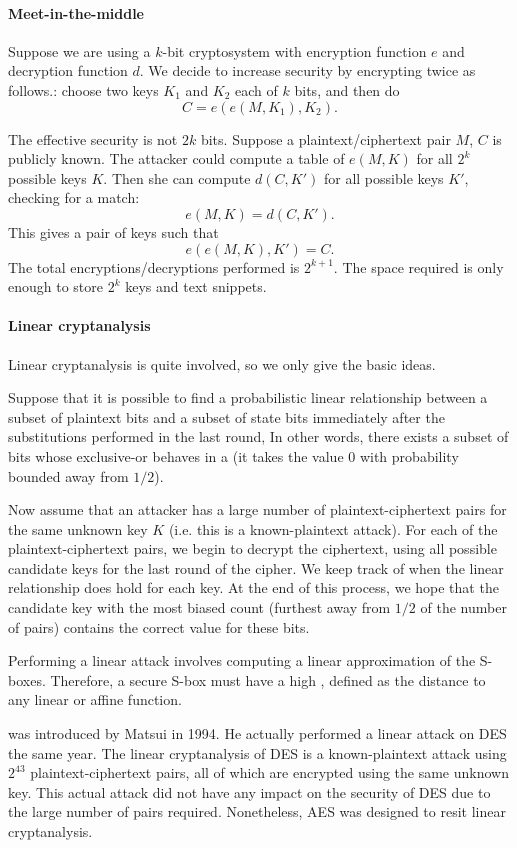 \documentclass[a4paper, 11pt, openany]{book}
\begin{document}
\paragraph{Meet-in-the-middle}
Suppose we are using a $k$-bit cryptosystem with encryption function $e$ and decryption function $d$. We decide to increase security by encrypting twice as follows.: choose two keys $K_1$ and $K_2$ each of $k$ bits, and then do
\[
    C = e( e(M,K_1) , K_2).
\]

The effective security is not $2k$ bits. Suppose a plaintext/ciphertext pair $M$, $C$ is publicly known. The attacker could compute a table of $e(M,K)$ for all $2^k$ possible keys $K$. Then she can compute $d(C,K')$ for all possible keys $K'$, checking for a match:
\[
    e(M,K) = d(C,K').
\]
This gives a pair of keys such that
\[
    e( e(M,K) , K') = C.
\]
The total encryptions/decryptions performed is $2^{k+1}$. The space required is only enough to store $2^k$ keys and text snippets.


\paragraph{Linear cryptanalysis}
Linear cryptanalysis is quite involved, so we only give the basic ideas.

Suppose that it is possible to find a probabilistic linear relationship between a subset of plaintext bits and a subset of state bits immediately after the substitutions performed in the last round, In other words, there exists a subset of bits whose exclusive-or behaves in a  (it takes the value $0$ with probability bounded away from $1/2$).

Now assume that an attacker has a large number of plaintext-ciphertext pairs for the same unknown key $K$ (i.e. this is a known-plaintext attack). For each of the plaintext-ciphertext pairs, we begin to decrypt the ciphertext, using all possible candidate keys for the last round of the cipher. We keep track of when the linear relationship does hold for each key. At the end of this process, we hope that the candidate key with the most biased count (furthest away from $1/2$ of the number of pairs) contains the correct value for these bits.

Performing a linear attack involves computing a linear approximation of the S-boxes. Therefore, a secure S-box must have a high , defined as the distance to any linear or affine function.

 was introduced by Matsui in 1994. He actually performed a linear attack on DES the same year. The linear cryptanalysis of DES is a known-plaintext attack using $2^{43}$ plaintext-ciphertext pairs, all of which are encrypted using the same unknown key. This actual attack did not have any impact on the security of DES due to the large number of pairs required. Nonetheless, AES was designed to resit linear cryptanalysis.
\end{document}
